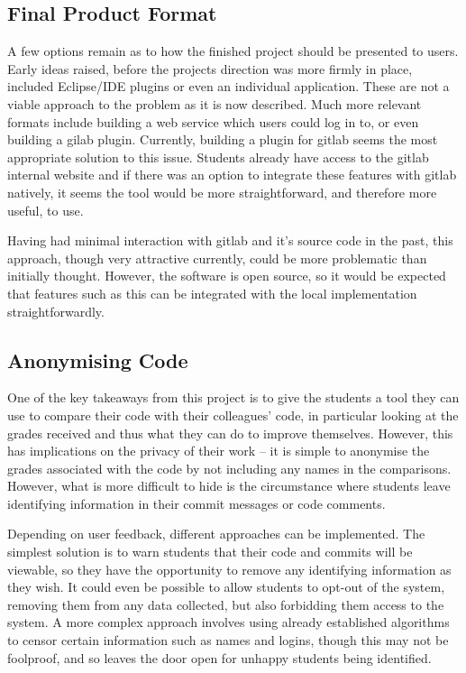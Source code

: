 \subsection{Final Product Format}

A few options remain as to how the finished project should be presented to users.
Early ideas raised, before the projects direction was more firmly in place,
included Eclipse/IDE plugins or even an individual application. These are not a
viable approach to the problem as it is now described. Much more relevant formats
include building a web service which users could log in to, or even building a
gilab plugin. Currently, building a plugin for gitlab seems the most appropriate
solution to this issue. Students already have access to the gitlab internal website
and if there was an option to integrate these features with gitlab natively, it
seems the tool would be more straightforward, and therefore more useful, to use.

Having had minimal interaction with gitlab and it's source code in the past, this
approach, though very attractive currently, could be more problematic than 
initially thought. However, the software is open source, so it would be expected
that features such as this can be integrated with the local implementation
straightforwardly.

\subsection{Anonymising Code}

One of the key takeaways from this project is to give the students a tool
they can use to compare their code with their colleagues' code, in particular
looking at the grades received and thus what they can do to improve themselves.
However, this has implications on the privacy of their work -- it is simple to
anonymise the grades associated with the code by not including any names in
the comparisons. However, what is more difficult to hide is the circumstance where
students leave identifying information in their commit messages or code comments.

Depending on user feedback, different approaches can be implemented. The simplest
solution is to warn students that their code and commits will be viewable, so
they have the opportunity to remove any identifying information as they wish. It
could even be possible to allow students to opt-out of the system, removing them
from any data collected, but also forbidding them access to the system. A more
complex approach involves using already established algorithms to censor certain
information such as names and logins, though this may not be foolproof, and so
leaves the door open for unhappy students being identified.

